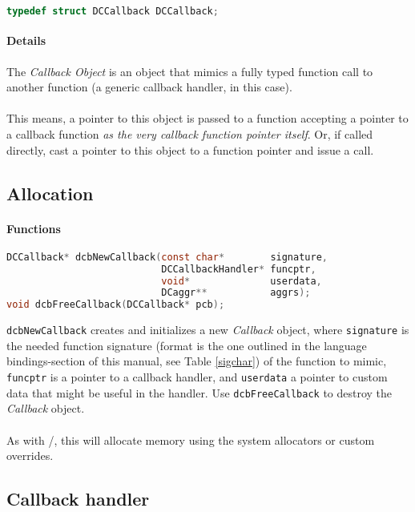 \begin{lstlisting}[language=c]
typedef struct DCCallback DCCallback;
\end{lstlisting}

\paragraph{Details}
The \emph{Callback Object} is an object that mimics a fully typed function
call to another function (a generic callback handler, in this case).\\
\\
This means, a pointer to this object is passed to a function accepting a pointer
to a callback function \emph{as the very callback function pointer itself}.
Or, if called directly, cast a pointer to this object to a function pointer and
issue a call.


\subsection{Allocation}

\paragraph{Functions}

\begin{lstlisting}[language=c]
DCCallback* dcbNewCallback(const char*        signature,
                           DCCallbackHandler* funcptr,
                           void*              userdata,
                           DCaggr**           aggrs);
void dcbFreeCallback(DCCallback* pcb);
\end{lstlisting}

\lstinline{dcbNewCallback} creates and initializes a new \emph{Callback} object,
where \lstinline{signature} is the needed function signature (format is the
one outlined in the language bindings-section of this manual, see Table \ref{sigchar})
of the function to mimic, \lstinline{funcptr} is a pointer to a callback handler,
and \lstinline{userdata} a pointer to custom data that might be useful in the
handler.
Use \lstinline{dcbFreeCallback} to destroy the \emph{Callback} object.\\
\\
As with /, this will allocate memory using the
system allocators or custom overrides.


\subsection{Callback handler}


